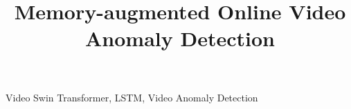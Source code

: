\documentclass{article}
\title{Memory-augmented Online Video Anomaly Detection}
\providecommand{\mnote}[1]{}
\begin{document}
%
\maketitle
%

\begin{abstract}
    
\end{abstract}
\begin{keywords}
    Video Swin Transformer, LSTM, Video Anomaly Detection
\end{keywords}


%
%







{


%
}
\end{document}
